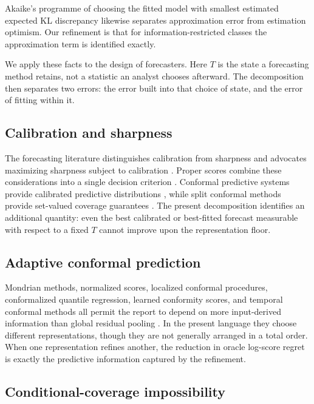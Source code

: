 \documentclass[11pt]{article}
\theoremstyle{remark}
\begin{document}
Akaike's programme of choosing the fitted model with smallest estimated expected KL
discrepancy \citep{akaike1974new} likewise separates approximation error from estimation
optimism. Our refinement is that for information-restricted classes the approximation term is
identified exactly.

We apply these facts to the design of forecasters. Here $T$ is the state a forecasting
method retains, not a statistic an analyst chooses afterward. The decomposition then
separates two errors: the error built into that choice of state, and the error of fitting
within it.

\subsection{Calibration and sharpness}

The forecasting literature distinguishes calibration from sharpness and advocates maximizing
sharpness subject to calibration \citep{gneiting2007probabilistic,dawid1984present}. Proper
scores combine these considerations into a single decision criterion
\citep{gneiting2007strictly}. Conformal predictive systems provide calibrated predictive
distributions \citep{vovk2019nonparametric}, while split conformal methods provide set-valued
coverage guarantees \citep{vovk2005algorithmic,lei2018distribution,angelopoulos2023gentle}. The
present decomposition identifies an additional quantity: even the best calibrated or best-fitted
forecast measurable with respect to a fixed $T$ cannot improve upon the representation floor.

\subsection{Adaptive conformal prediction}

Mondrian methods, normalized scores, localized conformal procedures, conformalized quantile
regression, learned conformity scores, and temporal conformal methods all permit the report to
depend on more input-derived information than global residual pooling
\citep{bostrom2021mondrian,lei2018distribution,romano2019conformalized,chernozhukov2021distributional,gibbs2021adaptive,auer2023hopcpt}.
In the present language they choose different representations, though they are not generally
arranged in a total order. When one representation refines another, the reduction in oracle
log-score regret is exactly the predictive information captured by the refinement.

\subsection{Conditional-coverage impossibility}
\end{document}
